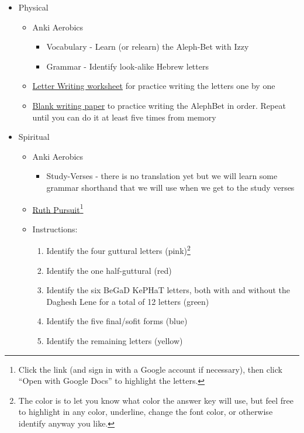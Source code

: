 \documentclass[
]{turabian-researchpaper}
\providecommand{\tightlist}{%
  \setlength{\itemsep}{0pt}\setlength{\parskip}{0pt}}
\begin{document}
\begin{itemize}
\tightlist
\item
  Physical

  \begin{itemize}
  \tightlist
  \item
    Anki Aerobics

    \begin{itemize}
    \tightlist
    \item
      Vocabulary - Learn (or relearn) the Aleph-Bet with Izzy
    \item
      Grammar - Identify look-alike Hebrew letters
    \end{itemize}
  \item
    \href{https://drive.google.com/file/d/1JcX8kc6e-fKjtzkeE96AwoZFshEpx3ug/view}{Letter Writing worksheet} for practice writing the letters one by one
  \item
    \href{https://drive.google.com/file/d/1mQcP6MMPDU--r374dZii7PxNzyd5NU6F/view?usp=sharing}{Blank writing paper} to practice writing the AlephBet in order. Repeat until you can do it at least five times from memory
  \end{itemize}
\item
  Spiritual

  \begin{itemize}
  \tightlist
  \item
    Anki Aerobics

    \begin{itemize}
    \tightlist
    \item
      Study-Verses - there is no translation yet but we will learn some grammar shorthand that we will use when we get to the study verses
    \end{itemize}
  \item
    \href{https://drive.google.com/file/d/1qcfTKAlTJGChC2eYCMhSbY2w-ibzCcDV/view?usp=sharing}{Ruth Pursuit}\footnote{Click the link (and sign in with a Google account if necessary), then click ``Open with Google Docs'' to highlight the letters.}
  \item
    Instructions:

    \begin{enumerate}
    \def\labelenumi{\arabic{enumi}.}
    \tightlist
    \item
      Identify the four guttural letters (pink)\footnote{The color is to let you know what color the answer key will use, but feel free to highlight in any color, underline, change the font color, or otherwise identify anyway you like.}
    \item
      Identify the one half-guttural (red)
    \item
      Identify the six BeGaD KePHaT letters, both with and without the Daghesh Lene for a total of 12 letters (green)
    \item
      Identify the five final/sofit forms (blue)
    \item
      Identify the remaining letters (yellow)
    \end{enumerate}


\end{itemize}
\end{itemize}
\end{document}

